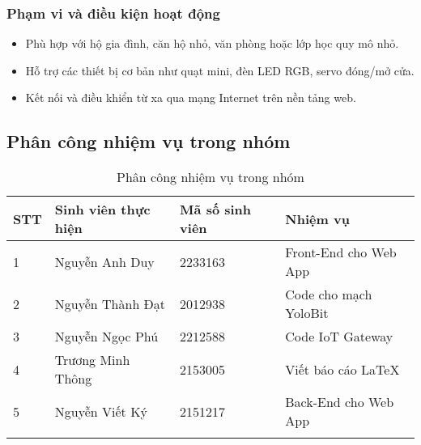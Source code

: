 \subsubsection{Phạm vi và điều kiện hoạt động}
\begin{itemize}
    \item Phù hợp với hộ gia đình, căn hộ nhỏ, văn phòng hoặc lớp học quy mô nhỏ.
    \item Hỗ trợ các thiết bị cơ bản như quạt mini, đèn LED RGB, servo đóng/mở cửa.
    \item Kết nối và điều khiển từ xa qua mạng Internet trên nền tảng web.
\end{itemize}

\subsection{Phân công nhiệm vụ trong nhóm}


\begin{longtable}{|p{}|p{}|p{}|p{}|}
    \hline
    \textbf{STT} & \textbf{Sinh viên thực hiện} & \textbf{Mã số sinh viên} & \textbf{Nhiệm vụ}     \\
    \hline
    1            & Nguyễn Anh Duy               & 2233163                  & Front-End cho Web App \\
    \hline
    2            & Nguyễn Thành Đạt             & 2012938                  & Code cho mạch YoloBit \\
    \hline
    3            & Nguyễn Ngọc Phú              & 2212588                  & Code IoT Gateway      \\
    \hline
    4            & Trương Minh Thông            & 2153005                  & Viết báo cáo \LaTeX   \\
    \hline
    5            & Nguyễn Viết Ký               & 2151217                  & Back-End cho Web App  \\
    \hline
    \caption{Phân công nhiệm vụ trong nhóm}
    \label{tab:phancong}
\end{longtable}